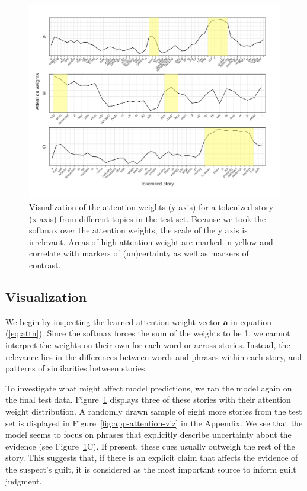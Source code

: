 \documentclass[11pt,a4paper]{article}
\begin{document}
\begin{figure}[t]
  \centering
  \includegraphics[width=1\linewidth]{graphs/attention-marked.pdf}
  \caption{Visualization of the attention weights (y axis) for a tokenized story (x axis) from different topics in the test set. Because we took the softmax over the attention weights, the scale of the y axis is irrelevant. Areas of high attention weight are marked in yellow and correlate with markers of (un)certainty as well as markers of contrast.}
  \label{fig:viz}
\end{figure}

\subsection{Visualization}

We begin by inspecting the learned attention weight vector $\mathbf{a}$ in equation (\ref{eq:attn}). Since the softmax forces the sum of the weights to be 1, we cannot interpret the weights on their own for each word or across stories. Instead, the relevance lies in the differences between words and phrases within each story, and patterns of similarities between stories.

To investigate what might affect model predictions, we ran the model again on the final test data. Figure~\ref{fig:viz} displays three of these stories with their attention weight distribution. A randomly drawn sample of eight more stories from the test set is displayed in Figure~\ref{fig:app-attention-viz} in the Appendix.
We see that the model seems to focus on phrases that explicitly describe uncertainty about the evidence (see Figure~\ref{fig:viz}C). If present, these cues usually outweigh the rest of the story. This suggests that, if there is an explicit claim that affects the evidence of the suspect's guilt, it is considered as the most important source to inform guilt judgment.
\end{document}

